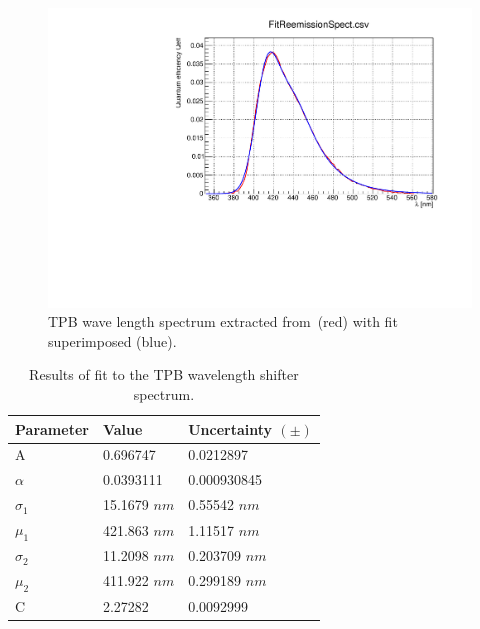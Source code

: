 \documentclass{article}
\begin{document}
\begin{figure}[ht]
\begin{center}
\includegraphics[width=35.5pc]{wls.pdf}
\end{center}
\caption{\label{fig:wls} TPB wave length spectrum extracted from~\cite{ref:wls}(red) with fit superimposed (blue).}
\end{figure}

\begin{table}[h!]
  \begin{center}
    \label{tab:wlsfit}
    \begin{tabular}{|l|l|l|} 
      \hline
      \textbf{Parameter} &\textbf{ Value } & \textbf{Uncertainty $(\pm)$}\\
      \hline
 A                        &     0.696747   &   0.0212897 \\  
$\alpha$                     &    0.0393111   &   0.000930845 \\
$\sigma_1$                      &      15.1679 $nm$  &   0.55542 $nm$    \\
$\mu_1$                       &      421.863   $nm$&   1.11517 $nm$    \\
$\sigma_2$                      &      11.2098 $nm$  &   0.203709 $nm$    \\
$\mu_2$                       &      411.922 $nm$  &   0.299189  $nm$  \\
C                     &      2.27282   &   0.0092999 \\
      \hline
    \end{tabular}
  \end{center}
  \caption{Results of fit to the TPB wavelength shifter spectrum.}
\end{table}
\end{document}
